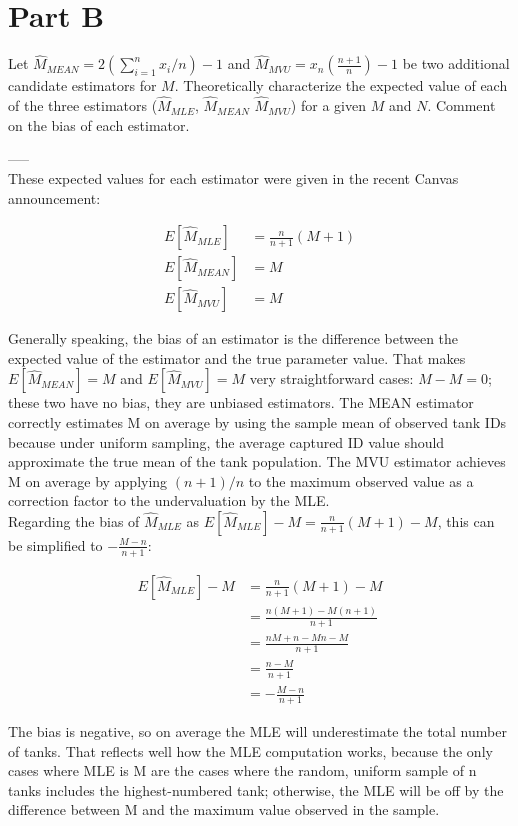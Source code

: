 \section{Part B}
Let $\hat{M}_{MEAN} = 2(\sum_{i=1}^n{x_i}/n)-1$
and  $\hat{M}_{MVU}=x_n(\frac{n+1}{n})-1$ be two additional candidate estimators for $M$. 
Theoretically characterize the expected value of each of the three estimators   ($\hat{M}_{MLE}$, $\hat{M}_{MEAN}$
$\hat{M}_{MVU}$) for a given $M$ and $N$.
Comment on the bias of each estimator.

-----\\

These expected values for each estimator were given in the recent Canvas announcement:

\begin{align*}
E[\hat{M}_{MLE}] &= \frac{n}{n+1}(M+1)\\
E[\hat{M}_{MEAN}] &= M\\
E[\hat{M}_{MVU}] &= M
\end{align*}

Generally speaking, the bias of an estimator is the difference between the expected value of the estimator and the true parameter value. That makes $ E[\hat{M}_{MEAN}] = M $ and $ E[\hat{M}_{MVU}] = M $ very straightforward cases: $ M-M = 0 $; these two have no bias, they are unbiased estimators. The MEAN estimator correctly estimates M on average by using the sample mean of observed tank IDs because under uniform sampling, the average captured ID value should approximate the true mean of the tank population. The MVU estimator achieves M on average by applying $(n+1)/n$ to the maximum observed value as a correction factor to the undervaluation by the MLE.\\

Regarding the bias of $\hat{M}_{MLE} $ as $ E[\hat{M}_{MLE}] - M = \frac{n}{n+1}(M+1) - M $, this can be simplified to $ -\frac{M-n}{n+1} $:

\begin{align*}
E[\hat{M}_{MLE}] - M &= \frac{n}{n+1}(M+1) - M\\
&= \frac{n(M+1) - M(n+1)}{n+1}\\
&= \frac{nM + n - Mn - M}{n+1}\\
&= \frac{n - M}{n+1}\\
&= -\frac{M-n}{n+1}
\end{align*}

The bias is negative, so on average the MLE will underestimate the total number of tanks. That reflects well how the MLE computation works, because the only cases where MLE is M are the cases where the random, uniform sample of n tanks includes the highest-numbered tank; otherwise, the MLE will be off by the difference between M and the maximum value observed in the sample.

\newpage
